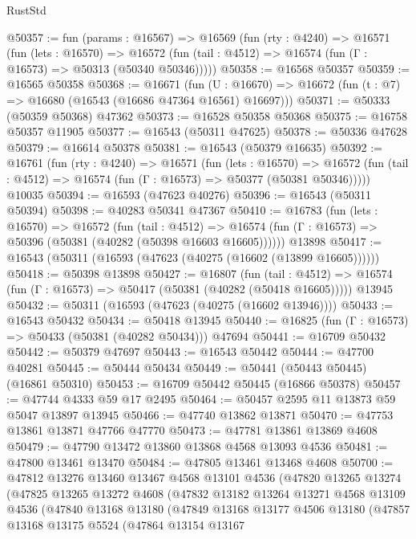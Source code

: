 \begin{lexlean}{RustStd}
\begin{coremodule}
@50357 := fun (params : @16567) =>
  @16569
    (fun (rty : @4240) =>
    @16571
      (fun (lets : @16570) =>
      @16572 (fun (tail : @4512) => @16574 (fun (Γ : @16573) => @50313 (@50340 @50346)))))
@50358 := @16568 @50357
@50359 := @16565 @50358
@50368 := @16671
    (fun (U : @16670) => @16672 (fun (t : @7) => @16680 (@16543 (@16686 @47364 @16561) @16697)))
@50371 := @50333 (@50359 @50368) @47362
@50373 := @16528 @50358 @50368
@50375 := @16758 @50357 @11905
@50377 := @16543 (@50311 @47625)
@50378 := @50336 @47628
@50379 := @16614 @50378
@50381 := @16543 (@50379 @16635)
@50392 := @16761
    (fun (rty : @4240) =>
    @16571
      (fun (lets : @16570) =>
      @16572 (fun (tail : @4512) => @16574 (fun (Γ : @16573) => @50377 (@50381 @50346)))))
    @10035
@50394 := @16593 (@47623 @40276)
@50396 := @16543 (@50311 @50394)
@50398 := @40283 @50341 @47367
@50410 := @16783
    (fun (lets : @16570) =>
    @16572
      (fun (tail : @4512) =>
      @16574 (fun (Γ : @16573) => @50396 (@50381 (@40282 (@50398 @16603 @16605))))))
    @13898
@50417 := @16543 (@50311 (@16593 (@47623 (@40275 (@16602 (@13899 @16605))))))
@50418 := @50398 @13898
@50427 := @16807
    (fun (tail : @4512) => @16574 (fun (Γ : @16573) => @50417 (@50381 (@40282 (@50418 @16605)))))
    @13945
@50432 := @50311 (@16593 (@47623 (@40275 (@16602 @13946))))
@50433 := @16543 @50432
@50434 := @50418 @13945
@50440 := @16825 (fun (Γ : @16573) => @50433 (@50381 (@40282 @50434))) @47694
@50441 := @16709 @50432
@50442 := @50379 @47697
@50443 := @16543 @50442
@50444 := @47700 @40281
@50445 := @50444 @50434
@50449 := @50441 (@50443 @50445) (@16861 @50310)
@50453 := @16709 @50442 @50445 (@16866 @50378)
@50457 := @47744 @4333 @59 @17 @2495
@50464 := @50457 @2595 @11 @13873 @59 @5047 @13897 @13945
@50466 := @47740 @13862 @13871
@50470 := @47753 @13861 @13871 @47766 @47770
@50473 := @47781 @13861 @13869 @4608
@50479 := @47790 @13472 @13860 @13868 @4568 @13093 @4536
@50481 := @47800 @13461 @13470
@50484 := @47805 @13461 @13468 @4608
@50700 := @47812
    @13276
    @13460
    @13467
    @4568
    @13101
    @4536
    (@47820
      @13265
      @13274
      (@47825
        @13265
        @13272
        @4608
        (@47832
          @13182
          @13264
          @13271
          @4568
          @13109
          @4536
          (@47840
            @13168
            @13180
            (@47849
              @13168
              @13177
              @4506
              @13180
              (@47857
                @13168
                @13175
                @5524
                (@47864
                  @13154
                  @13167

\end{coremodule}
\end{lexlean}
